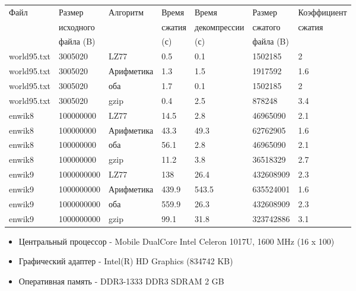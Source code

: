 \documentclass[12pt]{article}
\begin{document}
\noindent
\begin{tabular}{| l | l | l | l | l | l | l |}
	\hline
	Файл             & Размер 	  & Алгоритм   & Время  & Время        & Размер    & Коэффициент \\
	                 & исходного  &            & сжатия & декомпрессии & сжатого   & сжатия      \\
	                 & файла (B)  &            & (с)    & (с)          & файла (B) &             \\
	\hline
	world95.txt      & 3005020    & LZ77       & 0.5    & 0.1          & 1502185   & 2\\
	\hline
	world95.txt      & 3005020    & Арифметика & 1.3    & 1.5          & 1917592   & 1.6\\
	\hline
	world95.txt      & 3005020    & оба        & 1.7    & 0.1          & 1502185   & 2\\
	\hline
	world95.txt      & 3005020    & gzip       & 0.4    & 2.5          & 878248    & 3.4\\
	\hline
	enwik8           & 100000000  & LZ77       & 14.5   & 2.8          & 46965090  & 2.1\\
	\hline
	enwik8           & 100000000  & Арифметика & 43.3   & 49.3         & 62762905  & 1.6\\
	\hline
	enwik8           & 100000000  & оба        & 56.1   & 2.8          & 46965090  & 2.1\\
	\hline
	enwik8           & 100000000  & gzip       & 11.2   & 3.8          & 36518329  & 2.7\\
	\hline
	enwik9           & 1000000000 & LZ77       & 138    & 26.4         & 432608909 & 2.3\\
	\hline
	enwik9           & 1000000000 & Арифметика & 439.9  & 543.5        & 635524001 & 1.6\\
	\hline
	enwik9           & 1000000000 & оба        & 559.9  & 26.3         & 432608909 & 2.3\\
	\hline
	enwik9           & 1000000000 & gzip       & 99.1   & 31.8         & 323742886 & 3.1\\
	\hline
	

\end{tabular}

\begin{itemize}
	\item Центральный процессор - Mobile DualCore Intel Celeron 1017U, 1600 MHz (16 x 100)
	\item Графический адаптер - Intel(R) HD Graphics (834742 KB)
	\item Оперативная память - DDR3-1333 DDR3 SDRAM 2 GB
\end{itemize}
\end{document}
